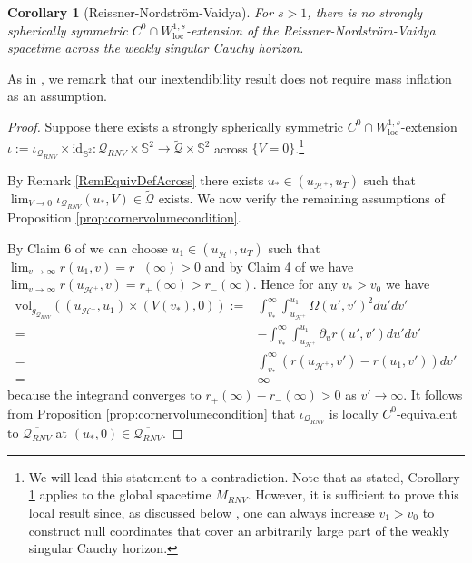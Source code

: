 \documentclass{article}
\newcommand{\Q}{\mathcal{Q}}
\newcommand{\loc}{\mathrm{loc}}
\newcommand{\Sp}{\mathbb{S}}
\newcommand{\id}{\mathrm{id}}
\newcommand{\vol}{\text{vol}}
\newtheorem{cor}[definition]{Corollary}
\begin{document}
\begin{cor}[Reissner-Nordstr\"{o}m-Vaidya]\label{cor:RNV}
    For $s>1$, there is no strongly spherically symmetric $C^0 \cap W^{1,s}_{\loc}$-extension of the Reissner-Nordstr\"{o}m-Vaidya spacetime across the weakly singular Cauchy horizon.
\end{cor}
As in \cite{Sbie22a}, we remark that our inextendibility result does not require mass inflation \cite{Ori:1991zz,Poisson:1989zz,Poisson:1990eh} as an assumption. 
\begin{proof} 
Suppose there exists a strongly spherically symmetric $C^0 \cap W^{1,s}_{\loc}$-extension $\iota:=\iota_{\Q_{RNV}}\times\id_{\Sp^2} : \Q_{RNV} \times \Sp^2 \to \tilde{\Q} \times \Sp^2$  across $\{V=0\}$.\footnote{We will lead this statement to a contradiction. Note that as stated, Corollary \ref{cor:RNV} applies to the global spacetime $M_{RNV}$. However, it is sufficient to prove this local result since, as discussed below \cite[Figure 10]{Sbie22a}, one can always increase $v_1 >v_0$ to construct null coordinates that cover an arbitrarily large part of the weakly singular Cauchy horizon.} 

By Remark \ref{RemEquivDefAcross} there exists $u_* \in (u_{\mathcal{H}^+}, u_T)$ such that $\lim_{V \to 0} \iota_{\Q_{RNV}}(u_*,V) \in \tilde{\Q}$ exists. We now verify the remaining assumptions of Proposition \ref{prop:cornervolumecondition}.

By Claim 6 of \cite[Section 4.2]{Sbie22a} we can choose $u_1\in(u_{\mathcal{H}^+},u_T)$ such that $\lim_{v\to\infty}r(u_1,v)=r_-(\infty)>0$ and by Claim 4 of \cite[Section 4.2]{Sbie22a} we have $\lim_{v\to\infty}r(u_{\mathcal{H}^+},v)=r_+(\infty)>r_-(\infty)$.
Hence for any $v_*>v_0$ we have
\begin{equation}
    \begin{split}
        \vol_{g_{\Q_{RNV}}}\left((u_{\mathcal{H}^+},u_1)\times(V(v_*),0)\right):=
        &\int_{v_*}^\infty\int_{u_{\mathcal{H}^+}}^{u_1}\Omega(u',v')^2du'dv'\\
        =&-\int_{v_*}^\infty\int_{u_{\mathcal{H}^+}}^{u_1}\partial_ur(u',v') du'dv'\\
        =&\int_{v_*}^\infty \left(r(u_{\mathcal{H}^+},v') -r(u_1,v'
        )\right)dv'\\
        =&\infty
    \end{split}
\end{equation}
because the integrand converges to $r_+(\infty)-r_-(\infty)>0$ as $v'\to\infty$. It follows from Proposition \ref{prop:cornervolumecondition} that $\iota_{\Q_{RNV}}$ is locally $C^0$-equivalent to $\overline{\Q_{RNV}}$ at $(u_*,0) \in \overline{\Q_{RNV}}$. 




\end{proof}
\end{document}
